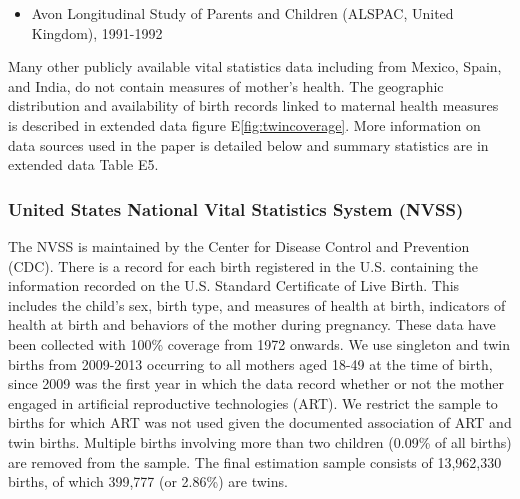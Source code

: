 \documentclass{nature}
\begin{document}
\begin{linenumbers}
\begin{itemize}
\item Avon Longitudinal Study of Parents and Children (ALSPAC, United Kingdom), 1991-1992 \vspace{-4mm}
\end{itemize}
Many other %
publicly available vital statistics data including from Mexico, Spain, and India, do not contain  measures of mother's health.  The geographic distribution and availability of birth records linked to maternal health measures is described in extended data figure E\ref{fig:twincoverage}.  %
More information on data sources used in the paper is detailed below and summary statistics are in extended data Table E5.

\subsubsection{United States National Vital Statistics System (NVSS)}
The NVSS is maintained by the Center for Disease Control and Prevention (CDC). %
 There is a record for each birth registered in the U.S. containing the information recorded on the U.S. Standard Certificate of Live Birth. This includes the child's sex, birth type, and measures of health at birth,  indicators of health at birth and behaviors of the mother during pregnancy. These data have been collected with 100\% coverage from 1972 onwards. We use singleton and twin births from 2009-2013\cite{Martinetal2013} occurring to all mothers aged 18-49 at the time of birth, since 2009 was the first year in which the data record whether or not the mother engaged in artificial reproductive technologies (ART).%
We restrict the sample to births for which ART was not used given the documented association of ART and twin births. Multiple births involving more than two children (0.09\% of all births) are removed from the sample. The final estimation sample consists of 13,962,330 births, of which 399,777 (or 2.86\%) are twins.
  


\end{linenumbers}
\end{document}

